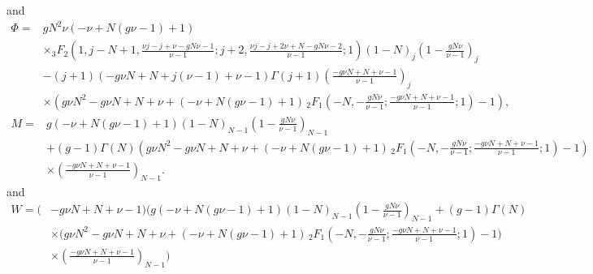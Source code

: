 and
\begin{align*}
\Phi =& g N^2 \nu (-\nu+N (g \nu-1)+1) \, \\
 &\times {}_3F_2\left(1,j-N+1,\frac{\nu j-j+\nu-g N \nu-1}{\nu-1};j+2,\frac{\nu j-j+2 \nu+N-g N \nu-2}{\nu-1};1\right) (1-N)_j \left(1-\frac{g N \nu}{\nu-1}\right)_j \\
 &-(j+1) (-g \nu N+N+j (\nu-1)+\nu-1) \Gamma (j+1) \left(\frac{-g \nu N+N+\nu-1}{\nu-1}\right)_j \\
 &\times \left(g \nu N^2-g \nu N+N+\nu+(-\nu+N (g \nu-1)+1) \, _2F_1\left(-N,-\frac{g N \nu}{\nu-1};\frac{-g \nu N+N+\nu-1}{\nu-1};1\right)-1\right),
\end{align*}
\begin{align*}
M =& g (-\nu+N (g \nu-1)+1) (1-N)_{N-1} \left(1-\frac{g N \nu}{\nu-1}\right)_{N-1} \\
 &+(g-1) \Gamma (N) \left(g \nu N^2-g \nu N+N+\nu+(-\nu+N (g \nu-1)+1) \, _2F_1\left(-N,-\frac{g N \nu}{\nu-1};\frac{-g \nu N+N+\nu-1}{\nu-1};1\right)-1\right) \\
 &\times \left(\frac{-g \nu N+N+\nu-1}{\nu-1}\right)_{N-1}.
\end{align*}
and
\begin{align*}
W = (&-g \nu N+N+\nu-1) \Bigg(g (-\nu+N (g \nu-1)+1) (1-N)_{N-1} \left(1-\frac{g N \nu}{\nu-1}\right)_{N-1} +(g-1) \Gamma (N) \\
 &\times \bigg( g \nu N^2-g \nu N+N+\nu+(-\nu+N (g \nu-1)+1) \, _2F_1\left(-N,-\frac{g N \nu}{\nu-1};\frac{-g \nu N+N+\nu-1}{\nu-1};1\right)-1\bigg) \\
 &\times \left(\frac{-g \nu N+N+\nu-1}{\nu-1}\right)_{N-1}\Bigg)
\end{align*}



